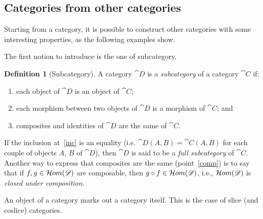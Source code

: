 \documentclass[a4paper, twoside,openright]{report}
\theoremstyle{plain}
\theoremstyle{definition}
\newtheorem{definition}[theorem]{Definition}
\begin{document}
\subsection{Categories from other categories}\label{ssect:cats_from_cats}

Starting from a category, it is possible to construct other categories with some interesting properties, as the following examples show.

The first notion to introduce is the one of subcategory.

\begin{definition}[Subcategory]
    A category $\cat{D}$ is a \emph{subcategory} of a category $\cat{C}$ if:
    \begin{enumerate}
        \item each object of $\cat{D}$ is an object of $\cat{C}$;
        \item \label{inc} each morphism between two objects of $\cat{D}$ is a morphism of $\cat{C}$; and
        \item \label{comp} composites and identities of $\cat{D}$ are the same of $\cat{C}$.
    \end{enumerate}

    If the inclusion at~\ref{inc} is an equality (i.e. $\cat{D}(A, B) = \cat{C}(A, B)$ for each couple of objects $A$, $B$ of $\cat{D}$), then $\cat{D}$ is said to be a \emph{full subcategory} of $\cat{C}$.
    Another way to express that composites are the same (point~\ref{comp}) is to say that if $f, g \in \mathcal{H}om(\mathscr{D})$ are composable, then $g \circ f \in \mathcal{H}om(\mathscr{D})$, i.e., $\mathcal{H}om(\mathscr{D})$ is \emph{closed under composition}.
\end{definition}

An object of a category marks out a category itself. This is the case of slice (and coslice) categories.
\end{document}
